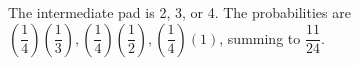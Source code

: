 The intermediate pad is 2, 3, or 4. The probabilities are $(\dfrac{1}{4}) (\dfrac{1}{3}) , (\dfrac{1}{4}) (\dfrac{1}{2}) , (\dfrac{1}{4}) (1)$, summing to $\boxed{\dfrac{11}{24}}$.
